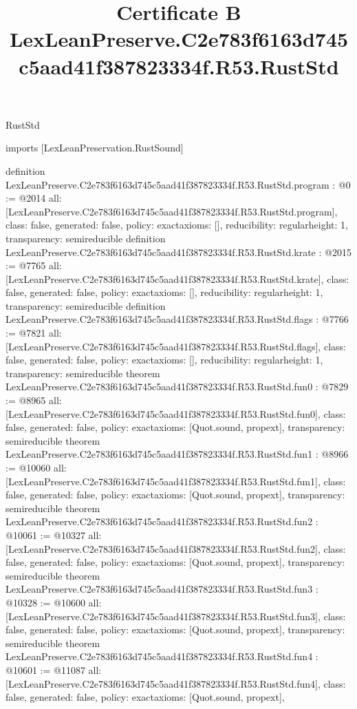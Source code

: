 \begin{lexlean}{RustStd}
\title{Certificate B LexLeanPreserve.C2e783f6163d745c5aad41f387823334f.R53.RustStd}
\begin{coremodule}
imports [LexLeanPreservation.RustSound]

definition LexLeanPreserve.C2e783f6163d745c5aad41f387823334f.R53.RustStd.program : @0 := @2014 {
  all: [LexLeanPreserve.C2e783f6163d745c5aad41f387823334f.R53.RustStd.program],
  class: false,
  generated: false,
  policy: exact{axioms: []},
  reducibility: regular{height: 1},
  transparency: semireducible
}
definition LexLeanPreserve.C2e783f6163d745c5aad41f387823334f.R53.RustStd.krate : @2015 := @7765 {
  all: [LexLeanPreserve.C2e783f6163d745c5aad41f387823334f.R53.RustStd.krate],
  class: false,
  generated: false,
  policy: exact{axioms: []},
  reducibility: regular{height: 1},
  transparency: semireducible
}
definition LexLeanPreserve.C2e783f6163d745c5aad41f387823334f.R53.RustStd.flags : @7766 := @7821 {
  all: [LexLeanPreserve.C2e783f6163d745c5aad41f387823334f.R53.RustStd.flags],
  class: false,
  generated: false,
  policy: exact{axioms: []},
  reducibility: regular{height: 1},
  transparency: semireducible
}
theorem LexLeanPreserve.C2e783f6163d745c5aad41f387823334f.R53.RustStd.fun0 : @7829 := @8965 {
  all: [LexLeanPreserve.C2e783f6163d745c5aad41f387823334f.R53.RustStd.fun0],
  class: false,
  generated: false,
  policy: exact{axioms: [Quot.sound, propext]},
  transparency: semireducible
}
theorem LexLeanPreserve.C2e783f6163d745c5aad41f387823334f.R53.RustStd.fun1 : @8966 := @10060 {
  all: [LexLeanPreserve.C2e783f6163d745c5aad41f387823334f.R53.RustStd.fun1],
  class: false,
  generated: false,
  policy: exact{axioms: [Quot.sound, propext]},
  transparency: semireducible
}
theorem LexLeanPreserve.C2e783f6163d745c5aad41f387823334f.R53.RustStd.fun2 : @10061 := @10327 {
  all: [LexLeanPreserve.C2e783f6163d745c5aad41f387823334f.R53.RustStd.fun2],
  class: false,
  generated: false,
  policy: exact{axioms: [Quot.sound, propext]},
  transparency: semireducible
}
theorem LexLeanPreserve.C2e783f6163d745c5aad41f387823334f.R53.RustStd.fun3 : @10328 := @10600 {
  all: [LexLeanPreserve.C2e783f6163d745c5aad41f387823334f.R53.RustStd.fun3],
  class: false,
  generated: false,
  policy: exact{axioms: [Quot.sound, propext]},
  transparency: semireducible
}
theorem LexLeanPreserve.C2e783f6163d745c5aad41f387823334f.R53.RustStd.fun4 : @10601 := @11087 {
  all: [LexLeanPreserve.C2e783f6163d745c5aad41f387823334f.R53.RustStd.fun4],
  class: false,
  generated: false,
  policy: exact{axioms: [Quot.sound, propext]},
}
\end{coremodule}
\end{lexlean}

